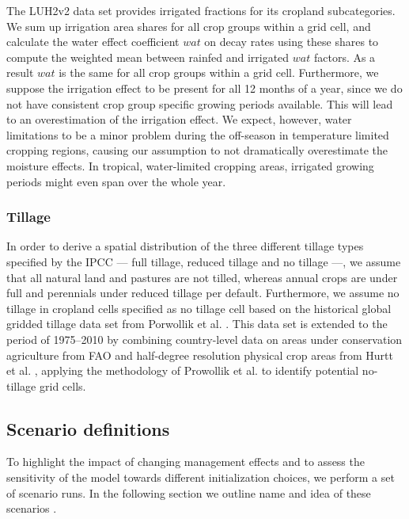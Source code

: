 \documentclass[gc, manuscript]{copernicus}
\begin{document}
The LUH2v2 \citep{hurtt_harmonization_2020} data set provides irrigated fractions for its cropland subcategories. We sum up irrigation area shares for all crop groups within a grid cell, and calculate the water effect coefficient \(wat\) on decay rates using these shares to compute the weighted mean between rainfed and irrigated \(wat\) factors. As a result \(wat\) is the same for all crop groups within a grid cell. Furthermore, we suppose the irrigation effect to be present for all 12 months of a year, since we do not have consistent crop group specific growing periods available. This will lead to an overestimation of the irrigation effect. We expect, however, water limitations to be a minor problem during the off-season in temperature limited cropping regions, causing our assumption to not dramatically overestimate the moisture effects. In tropical, water-limited cropping areas, irrigated growing periods might even span over the whole year.

\hypertarget{sec:tillage}{%
\subsubsection{Tillage}\label{sec:tillage}}

In order to derive a spatial distribution of the three different tillage types specified by the IPCC --- full tillage, reduced tillage and no tillage ---, we assume that all natural land and pastures are not tilled, whereas annual crops are under full and perennials under reduced tillage per default. Furthermore, we assume no tillage in cropland cells specified as no tillage cell based on the historical global gridded tillage data set from Porwollik et al. \citeyearpar{porwollik_generating_2019}. This data set is extended to the period of 1975--2010 by combining country-level data on areas under conservation agriculture from FAO \citeyearpar{fao_aquastat_2016} and half-degree resolution physical crop areas from Hurtt et al. \citeyearpar{hurtt_harmonization_2020}, applying the methodology of Prowollik et al. \citeyearpar{porwollik_generating_2019} to identify potential no-tillage grid cells.

\hypertarget{sec:scenarios}{%
\subsection{Scenario definitions}\label{sec:scenarios}}

To highlight the impact of changing management effects and to assess the sensitivity of the model towards different initialization choices, we perform a set of scenario runs. In the following section we outline name and idea of these scenarios \citep[for technical implementation see][]{karstens_mrsoil_2020}.
\end{document}
